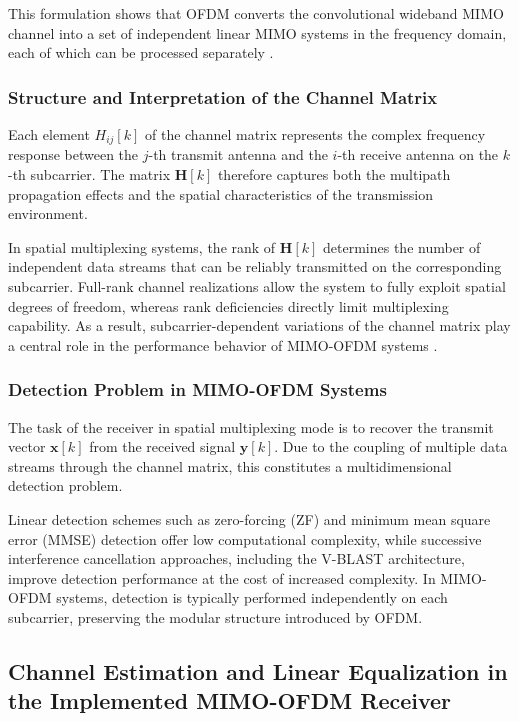 This formulation shows that OFDM converts the convolutional wideband MIMO channel into a set of independent linear MIMO systems in the frequency domain, each of which can be processed separately \cite{proakis2008digital,tse2005fundamentals}.

\subsubsection{Structure and Interpretation of the Channel Matrix}

Each element $H_{ij}[k]$ of the channel matrix represents the complex frequency response between the $j$-th transmit antenna and the $i$-th receive antenna on the $k$-th subcarrier. The matrix $\mathbf{H}[k]$ therefore captures both the multipath propagation effects and the spatial characteristics of the transmission environment.

In spatial multiplexing systems, the rank of $\mathbf{H}[k]$ determines the number of independent data streams that can be reliably transmitted on the corresponding subcarrier. Full-rank channel realizations allow the system to fully exploit spatial degrees of freedom, whereas rank deficiencies directly limit multiplexing capability. As a result, subcarrier-dependent variations of the channel matrix play a central role in the performance behavior of MIMO-OFDM systems \cite{tse2005fundamentals}.

\subsubsection{Detection Problem in MIMO-OFDM Systems}

The task of the receiver in spatial multiplexing mode is to recover the transmit vector $\mathbf{x}[k]$ from the received signal $\mathbf{y}[k]$. Due to the coupling of multiple data streams through the channel matrix, this constitutes a multidimensional detection problem.

Linear detection schemes such as zero-forcing (ZF) and minimum mean square error (MMSE) detection offer low computational complexity, while successive interference cancellation approaches, including the V-BLAST architecture, improve detection performance at the cost of increased complexity. In MIMO-OFDM systems, detection is typically performed independently on each subcarrier, preserving the modular structure introduced by OFDM.

\subsection{Channel Estimation and Linear Equalization in the Implemented MIMO-OFDM Receiver}
\label{sec:chest_mmse_impl}

